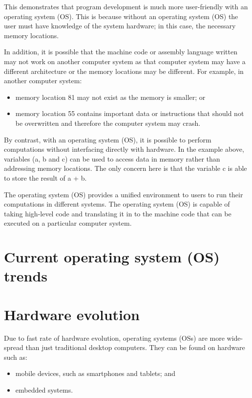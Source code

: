 \documentclass[a4paper]{systems-software}
\begin{document}
This demonstrates that program development is much more user-friendly with an operating system (OS). This is because without an operating system (OS) the user must have knowledge of the system hardware; in this case, the necessary memory locations.

In addition, it is possible that the machine code or assembly language written may not work on another computer system as that computer system may have a different architecture or the memory locations may be different. For example, in another computer system:
\begin{itemize}
	\item memory location 81 may not exist as the memory is smaller; or
	\item memory location 55 contains important data or instructions that should not be overwritten and therefore the computer system may crash.
\end{itemize}

By contrast, with an operating system (OS), it is possible to perform computations without interfacing directly with hardware. In the example above, variables (a, b and c) can be used to access data in memory rather than addressing memory locations. The only concern here is that the variable c is able to store the result of a + b.

The operating system (OS) provides a unified environment to users to run their computations in different systems. The operating system (OS) is capable of taking high-level code and translating it in to the machine code that can be executed on a particular computer system.


\section{Current operating system (OS) trends}

\section*{Hardware evolution}

Due to fast rate of hardware evolution, operating systems (OSs) are more wide-spread than just traditional desktop computers. They can be found on hardware such as:
\begin{itemize}
	\item mobile devices, such as smartphones and tablets; and
	\item embedded systems.
\end{itemize}
\end{document}
